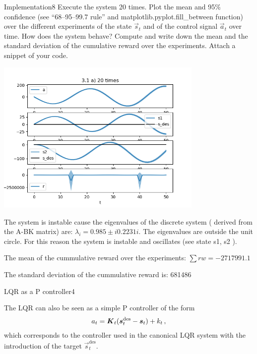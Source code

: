 \begin{questions}
\begin{question}{Implementation}{8}
	Execute the system 20 times.
	Plot the mean and 95\% confidence (see ``68--95--99.7 rule'' and matplotlib.pyplot.fill\_between function) over the different experiments of the state $\vec s_t$ and of the control signal $\vec a_t$ over time. 
	How does the system behave? 
	Compute and write down the mean and the standard deviation of the cumulative reward over the experiments. 
	Attach a snippet of your code.
	
\begin{answer}
	
\begin{center}
	\includegraphics[width=0.75\textwidth]{img/1a_20.png}
\end{center}

The system is instable cause the eigenvalues of the discrete system ( derived from the A-BK matrix) are: $\lambda_i = 0.985 \pm i 0.2231 i$. The eigenvalues are outside the unit circle. For this reason the system is instable and  oscillates (see state s1, s2 ).

The mean of the  cummulative reward over the experiments:  $\sum rw = -2717991.1$

The standard deviation of the cummulative reward is: 681486


\end{answer}

\end{question}


\begin{question}{LQR as a P controller}{4}

	The LQR can also be seen as a simple P controller of the form
	\begin{align}
		a_t = {\boldsymbol{K}}_t ({\boldsymbol{s}}^\text{des}_t - {\boldsymbol{s}}_t) + k_t\,,
	\end{align}
	which corresponds to the controller used in the canonical LQR system with the introduction of the target $\vec s^\text{des}_t$.
	

\end{question}
\end{questions}
